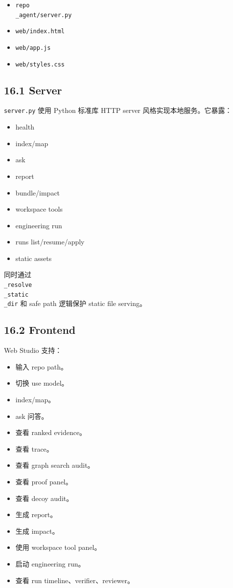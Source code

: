 \documentclass[UTF8,12pt,openany]{ctexbook}
\begin{document}
\begin{itemize}
\item \texttt{repo\\_agent/server.py}
\item \texttt{web/index.html}
\item \texttt{web/app.js}
\item \texttt{web/styles.css}
\end{itemize}

\subsection{16.1 Server}

\texttt{server.py} 使用 Python 标准库 HTTP server 风格实现本地服务。它暴露：\par

\begin{itemize}
\item health
\item index/map
\item ask
\item report
\item bundle/impact
\item workspace tools
\item engineering run
\item runs list/resume/apply
\item static assets
\end{itemize}

同时通过 \texttt{\\_resolve\\_static\\_dir} 和 safe path 逻辑保护 static file serving。\par

\subsection{16.2 Frontend}

Web Studio 支持：\par

\begin{itemize}
\item 输入 repo path。
\item 切换 use model。
\item index/map。
\item ask 问答。
\item 查看 ranked evidence。
\item 查看 trace。
\item 查看 graph search audit。
\item 查看 proof panel。
\item 查看 decoy audit。
\item 生成 report。
\item 生成 impact。
\item 使用 workspace tool panel。
\item 启动 engineering run。
\item 查看 run timeline、verifier、reviewer。
\end{itemize}
\end{document}
